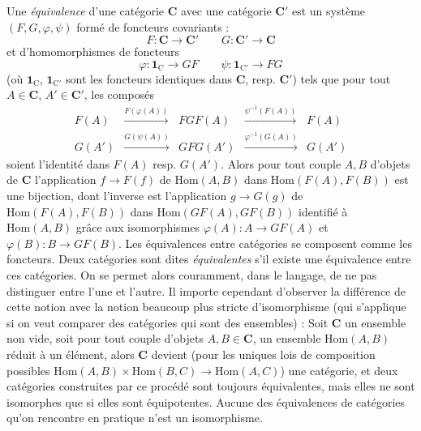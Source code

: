 Une \textit{équivalence} d'une catégorie $\mathbf{C}$ avec une catégorie $\mathbf{C}'$ est un
système $(F,G,\varphi,\psi)$ formé de foncteurs covariants :
\[
  F:\mathbf{C}\to\mathbf{C}' \qquad G:\mathbf{C}'\to\mathbf{C}
\]
et d'homomorphismes de foncteurs
\[
  \varphi:\mathbf{1}_{\mathrm{C}}\to GF \qquad
  \psi:\mathbf{1}_{\mathrm{C}'}\to FG
\]
(où $\mathbf{1}_{\mathrm{C}}$, $\mathbf{1}_{\mathrm{C}'}$ sont les foncteurs identiques dans $\mathbf{C}$, resp. $\mathbf{C}'$) tels
que pour tout $A\in \mathbf{C}$, $A'\in \mathbf{C}'$, les composés
\[
\begin{array}{ccccc}
F(A) & \stackrel{F(\varphi(A))}{\longrightarrow} & FGF(A) &
\stackrel{\psi^{-1}(F(A))}{\longrightarrow} & F(A) \\
G(A') & \stackrel{G(\psi(A))}{\longrightarrow} & GFG(A') &
\stackrel{\varphi^{-1}(G(A))}{\longrightarrow} & G(A')
\end{array}
\]
soient l'identité dans $F(A)$ resp. $G(A')$. Alors pour tout couple $A,B$
d'objets de $\mathbf{C}$ l'application $f\to F(f)$ de
$\mathrm{Hom}(A,B)$ dans $\mathrm{Hom}(F(A),F(B))$ est une bijection, dont
l'inverse est l'application $g\to G(g)$ de
$\mathrm{Hom}(F(A),F(B))$ dans $\mathrm{Hom}(GF(A),GF(B))$ identifié à
$\mathrm{Hom}(A,B)$ grâce aux isomorphismes
$\varphi(A):A\to GF(A)$ et
$\varphi(B):B\to GF(B)$. Les équivalences entre catégories se
composent comme les foncteurs. Deux catégories sont dites
\textit{équivalentes} s'il existe une équivalence entre ces catégories. On se
permet alors couramment, dans le langage, de ne pas distinguer entre l'une et
l'autre. Il importe cependant d'observer la différence de cette notion avec la
notion beaucoup plus stricte d'isomorphisme (qui s'applique si on veut comparer
des catégories qui sont des ensembles) : Soit $\mathbf{C}$ un ensemble non vide, soit
pour tout couple d'objets $A,B\in \mathbf{C}$, un ensemble $\mathrm{Hom}(A,B)$ réduit à
un élément, alors $\mathbf{C}$ devient (pour les uniques lois de composition possibles
$\mathrm{Hom}(A,B)\times\mathrm{Hom}(B,C)\to\mathrm{Hom}(A,C)$)
une catégorie, et deux catégories construites par ce procédé sont toujours
équivalentes, mais elles ne sont isomorphes que si elles sont équipotentes.
Aucune des équivalences de catégories qu'on rencontre en pratique n'est un
isomorphisme.

